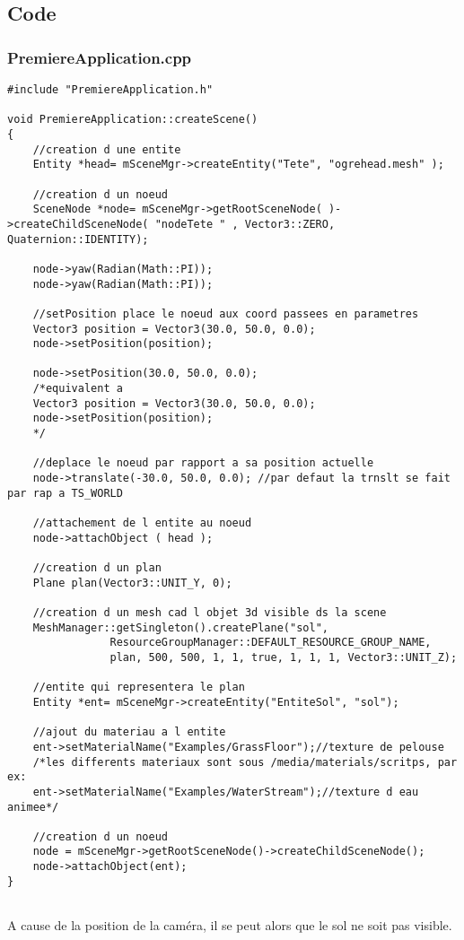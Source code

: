 \subsection{Code}

\subsubsection{PremiereApplication.cpp}
\begin{lstlisting}[caption={PremiereApplication.cpp: Cr\'eation d'un sol}]
#include "PremiereApplication.h"

void PremiereApplication::createScene()
{
    //creation d une entite
    Entity *head= mSceneMgr->createEntity("Tete", "ogrehead.mesh" );
    
    //creation d un noeud
    SceneNode *node= mSceneMgr->getRootSceneNode( )->createChildSceneNode( "nodeTete " , Vector3::ZERO, Quaternion::IDENTITY);
    
    node->yaw(Radian(Math::PI));
    node->yaw(Radian(Math::PI));

    //setPosition place le noeud aux coord passees en parametres
    Vector3 position = Vector3(30.0, 50.0, 0.0);
    node->setPosition(position);

    node->setPosition(30.0, 50.0, 0.0); 
    /*equivalent a
    Vector3 position = Vector3(30.0, 50.0, 0.0);
    node->setPosition(position);
    */

    //deplace le noeud par rapport a sa position actuelle
    node->translate(-30.0, 50.0, 0.0); //par defaut la trnslt se fait par rap a TS_WORLD
   
    //attachement de l entite au noeud
    node->attachObject ( head );

    //creation d un plan
    Plane plan(Vector3::UNIT_Y, 0);

    //creation d un mesh cad l objet 3d visible ds la scene
    MeshManager::getSingleton().createPlane("sol",
                ResourceGroupManager::DEFAULT_RESOURCE_GROUP_NAME,
                plan, 500, 500, 1, 1, true, 1, 1, 1, Vector3::UNIT_Z); 

    //entite qui representera le plan
    Entity *ent= mSceneMgr->createEntity("EntiteSol", "sol");

    //ajout du materiau a l entite
    ent->setMaterialName("Examples/GrassFloor");//texture de pelouse
    /*les differents materiaux sont sous /media/materials/scritps, par ex:
    ent->setMaterialName("Examples/WaterStream");//texture d eau animee*/

    //creation d un noeud
    node = mSceneMgr->getRootSceneNode()->createChildSceneNode();
    node->attachObject(ent);
}


\end{lstlisting}

A cause de la position de la cam\'era, il se peut alors que le sol ne soit pas visible.

